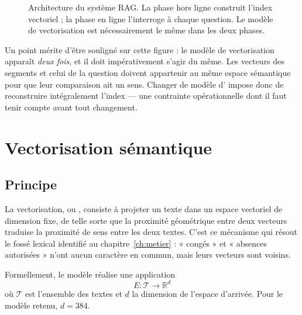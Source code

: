 \begin{figure}[htbp]
\caption{Architecture du système RAG. La phase hors ligne construit l'index
vectoriel ; la phase en ligne l'interroge à chaque question. Le modèle de
vectorisation est nécessairement le même dans les deux phases.}
\label{fig:archi}
\end{figure}

Un point mérite d'être souligné sur cette figure : le modèle de vectorisation
apparaît \emph{deux fois}, et il doit impérativement s'agir du même. Les vecteurs
des segments et celui de la question doivent appartenir au même espace
sémantique pour que leur comparaison ait un sens. Changer de modèle
d' impose donc de reconstruire intégralement l'index --- une
contrainte opérationnelle dont il faut tenir compte avant tout changement.

\section{Vectorisation sémantique}

\subsection{Principe}

La vectorisation, ou , consiste à projeter un texte dans un espace
vectoriel de dimension fixe, de telle sorte que la proximité géométrique entre
deux vecteurs traduise la proximité de sens entre les deux textes. C'est ce
mécanisme qui résout le fossé lexical identifié au chapitre~\ref{ch:metier} :
« congés » et « absences autorisées » n'ont aucun caractère en commun, mais
leurs vecteurs sont voisins.

Formellement, le modèle réalise une application
\[
  E : \mathcal{T} \longrightarrow \mathbb{R}^{d}
\]
où $\mathcal{T}$ est l'ensemble des textes et $d$ la dimension de l'espace
d'arrivée. Pour le modèle retenu, $d = 384$.

